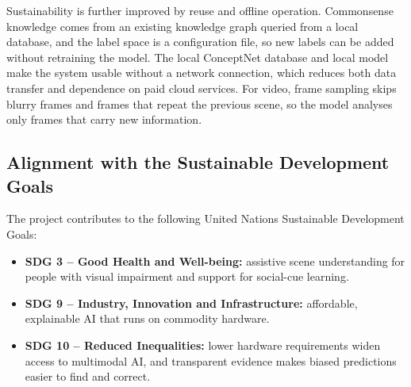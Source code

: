 Sustainability is further improved by reuse and offline operation. Commonsense knowledge comes from an existing knowledge graph queried from a local database, and the label space is a configuration file, so new labels can be added without retraining the model. The local ConceptNet database and local model make the system usable without a network connection, which reduces both data transfer and dependence on paid cloud services. For video, frame sampling skips blurry frames and frames that repeat the previous scene, so the model analyses only frames that carry new information.

\subsection{Alignment with the Sustainable Development Goals}

The project contributes to the following United Nations Sustainable Development Goals:
\begin{itemize}
\item \textbf{SDG 3 -- Good Health and Well-being:} assistive scene understanding for people with visual impairment and support for social-cue learning.
\item \textbf{SDG 9 -- Industry, Innovation and Infrastructure:} affordable, explainable AI that runs on commodity hardware.
\item \textbf{SDG 10 -- Reduced Inequalities:} lower hardware requirements widen access to multimodal AI, and transparent evidence makes biased predictions easier to find and correct.
\end{itemize}
